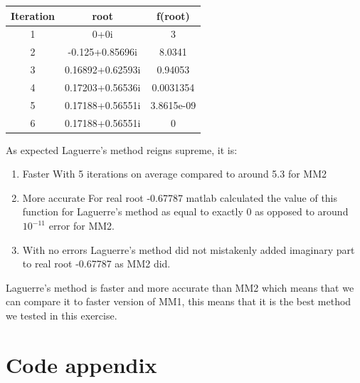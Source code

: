 \begin{center}
  \begin{tabular}{| c  c c |}
\hline
Iteration & root         & f(root) \\
\hline
1   &         0+0i          &            3 \\
\hline
2   &    -0.125+0.85696i    &       8.0341 \\
\hline
3   &   0.16892+0.62593i    &      0.94053 \\
\hline
4   &   0.17203+0.56536i    &    0.0031354  \\
\hline
5   &   0.17188+0.56551i    &   3.8615e-09  \\
\hline
6   &   0.17188+0.56551i    &            0  \\
\hline
\hline

\end{tabular}
\end{center}

As expected Laguerre's method reigns supreme, it is:
\begin{enumerate}
\item Faster
With 5 iterations on average compared to around 5.3 for MM2
\item More accurate
For real root -0.67787 matlab calculated the value of this function for Laguerre's method as equal to exactly 0 as opposed to around $10^{-11}$ error for MM2.
\item With no errors
Laguerre's method did not mistakenly added imaginary part to real root -0.67787 as MM2 did. 
\end{enumerate}

Laguerre's method is faster and more accurate than MM2 which means that we can compare it to faster version of MM1, this means that it is the best method we tested in this exercise.

\chapter{Code appendix}


